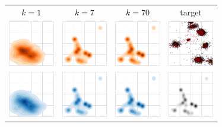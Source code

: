 \begin{figure}
\begin{centering}
\setlength\tabcolsep{1pt}
\begin{tabular}{ccc|c}
$k=1$ & $k=7$ & $k=70$ & target\tabularnewline
\includegraphics[width=2cm]{figures/toy_save/output_dist_k=1-crop.pdf} & \includegraphics[width=2cm]{figures/toy_save/output_dist_k=20-crop.pdf} & \includegraphics[width=2cm]{figures/toy_save/output_dist_k=70-crop.pdf} &  \includegraphics[width=2cm]{figures/scatter_output_particles_k=70-crop.pdf}\tabularnewline
\includegraphics[width=2cm]{figures/toy_load/output_dist_k=1-crop.pdf} & \includegraphics[width=2cm]{figures/toy_load/output_dist_k=20-crop.pdf} & \includegraphics[width=2cm]{figures/toy_load/output_dist_k=70-crop.pdf} &  \includegraphics[width=2cm]{figures/target-crop.pdf}\tabularnewline

\end{tabular}
\end{centering}
\end{figure}
